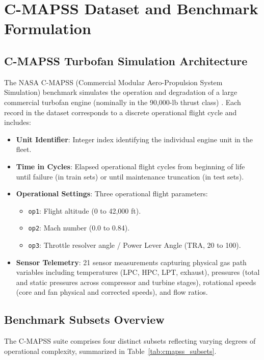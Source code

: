 \section{C-MAPSS Dataset and Benchmark Formulation}
\label{sec:dataset}

\subsection{C-MAPSS Turbofan Simulation Architecture}
The NASA C-MAPSS (Commercial Modular Aero-Propulsion System Simulation) benchmark simulates the operation and degradation of a large commercial turbofan engine (nominally in the 90,000-lb thrust class) \cite{saxena2008damage}. Each record in the dataset corresponds to a discrete operational flight cycle and includes:
\begin{itemize}
    \item \textbf{Unit Identifier}: Integer index identifying the individual engine unit in the fleet.
    \item \textbf{Time in Cycles}: Elapsed operational flight cycles from beginning of life until failure (in train sets) or until maintenance truncation (in test sets).
    \item \textbf{Operational Settings}: Three operational flight parameters:
    \begin{itemize}
        \item \texttt{op1}: Flight altitude (0 to 42,000 ft).
        \item \texttt{op2}: Mach number (0.0 to 0.84).
        \item \texttt{op3}: Throttle resolver angle / Power Lever Angle (TRA, 20 to 100).
    \end{itemize}
    \item \textbf{Sensor Telemetry}: 21 sensor measurements capturing physical gas path variables including temperatures (LPC, HPC, LPT, exhaust), pressures (total and static pressures across compressor and turbine stages), rotational speeds (core and fan physical and corrected speeds), and flow ratios.
\end{itemize}

\subsection{Benchmark Subsets Overview}
The C-MAPSS suite comprises four distinct subsets reflecting varying degrees of operational complexity, summarized in Table~\ref{tab:cmapss_subsets}.


